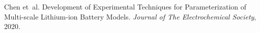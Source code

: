 
\begin{DoxyDescription}
\item[\label{_CITEREF_Chen2020}%
\mbox{[}1\mbox{]}]Chen et~al. Development of Experimental Techniques for Parameterization of Multi-\/scale Lithium-\/ion Battery Models. {\itshape Journal of The Electrochemical Society}, 2020.


\end{DoxyDescription}